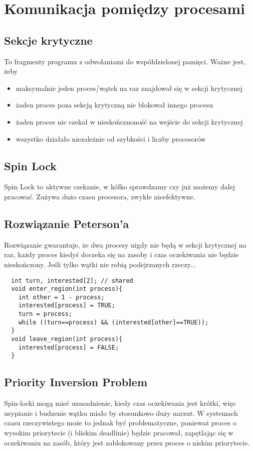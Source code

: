 \documentclass[12pt, a4paper, polish, openany]{book}
\begin{document}
\section{Komunikacja pomiędzy procesami}
\subsection{Sekcje krytyczne} To fragmenty programu z odwołaniami do współdzielonej pamięci. Ważne jest, żeby
\begin{itemize}
  \item maksymalnie jeden proces/wątek na raz znajdował się w sekcji krytycznej
  \item żaden proces poza sekcją krytyczną nie blokował innego procesu
  \item żaden proces nie czekał w nieskończnoność na wejście do sekcji krytycznej
  \item wszystko działało niezależnie od szybkości i liczby procesorów
\end{itemize}
\subsection{Spin Lock}
Spin Lock to aktywne czekanie, w kółko sprawdzamy czy już możemy dalej pracować. Zużywa dużo czasu procesora, zwykle nieefektywne.
\subsection{Rozwiązanie Peterson'a}
Rozwiązanie gwarantuje, że dwa procesy nigdy nie będą w sekcji krytycznej na raz, każdy proces kiedyś doczeka się na zasoby i czas oczekiwania nie będzie nieskończony. Jeśli tylko wątki nie robią podejrzanych rzeczy...
\begin{verbatim}
  int turn, interested[2]; // shared
  void enter_region(int process){
    int other = 1 - process;
    interested[process] = TRUE;
    turn = process;
    while ((turn==process) && (interested[other]==TRUE));
  }
  void leave_region(int process){
    interested[process] = FALSE;
  }
\end{verbatim}
\subsection{Priority Inversion Problem}
Spin-locki mogą mieć uzasadnienie, kiedy czas oczekiwania jest krótki, więc usypianie i budzenie wątku miało by stosunkowo duży narzut. W systemach czasu rzeczywistego może to jednak być problematyczne, ponieważ proces o wysokim priorytecie (i bliskim deadlinie) będzie pracował, zapętlając się w oczekiwaniu na zasób, który jest zablokowany przez proces o niskim priorytecie.
\end{document}
